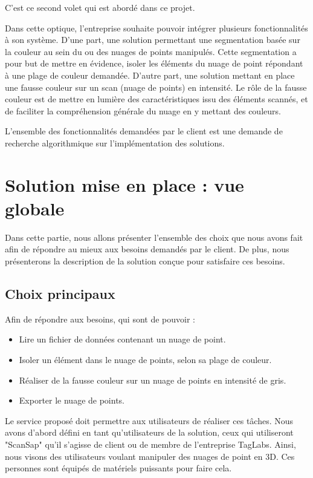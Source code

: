 \documentclass[12pt,titlepage,french]{article}
\begin{document}
C’est ce second volet qui est abordé dans ce projet. \newline

Dans cette optique, l'entreprise souhaite pouvoir intégrer plusieurs fonctionnalités à son système. D'une part, une solution permettant une segmentation basée sur la couleur au sein du ou des nuages de points manipulés. Cette segmentation a pour but de mettre en évidence, isoler les éléments du nuage de point répondant à une plage de couleur demandée. D'autre part, une solution mettant en place une fausse couleur sur un scan (nuage de points) en intensité. Le rôle de la fausse couleur est de mettre en lumière des caractéristiques issu des éléments scannés, et de faciliter la compréhension générale du nuage en y mettant des couleurs. \newline

L'ensemble des fonctionnalités demandées par le client est une demande de recherche algorithmique sur l'implémentation des solutions.

\section{Solution mise en place : vue globale}

Dans cette partie, nous allons présenter l'ensemble des choix que nous avons fait afin de répondre au mieux aux besoins demandés par le client. De plus, nous présenterons la description de la solution conçue pour satisfaire ces besoins.

\subsection{Choix principaux}

Afin de répondre aux besoins, qui sont de pouvoir :
\begin{itemize}
    \item Lire un fichier de données contenant un nuage de point.
    \item Isoler un élément dans le nuage de points, selon sa plage de couleur.
    \item Réaliser de la fausse couleur sur un nuage de points en intensité de gris.
    \item Exporter le nuage de points. \newline
\end{itemize}

Le service proposé doit permettre aux utilisateurs de réaliser ces tâches. Nous avons d'abord défini en tant qu'utilisateurs de la solution, ceux qui utiliseront "ScanSap" qu'il s'agisse de client ou de membre de l'entreprise TagLabs. Ainsi, nous visons des utilisateurs voulant manipuler des nuages de point en 3D. Ces personnes sont équipés de matériels puissants pour faire cela.\newline
\end{document}
